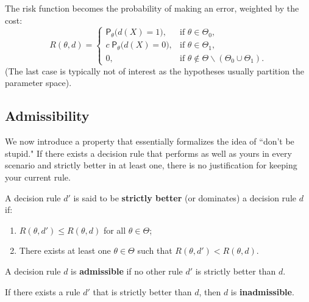 \begin{ex}[continued]
\begin{enumerate}[label=\roman*.]
    The risk function becomes the probability of making an error, weighted by the cost:
    \[
    R(\theta, d) = 
    \begin{cases} 
    \mathsf{P}_{\theta} \big( d(X) = 1 \big), & \text{if } \theta \in \Theta_0, \\ 
    c \; \mathsf{P}_{\theta} \big( d(X) = 0 \big), & \text{if } \theta \in \Theta_1, \\ 
    0, & \text{if } \theta \notin \Theta \backslash (\Theta_0 \cup \Theta_1). 
    \end{cases}
    \]
    (The last case is typically not of interest as the hypotheses usually partition the parameter space).
\end{enumerate}
\end{ex}

\subsection{Admissibility}
\label{subsec:admissibility}

We now introduce a property that essentially formalizes the idea of ``don't be stupid." If there exists a decision rule that performs as well as yours in every scenario and strictly better in at least one, there is no justification for keeping your current rule.

\begin{definition}
\label{def:strictly_better}
A decision rule \(d'\) is said to be \textbf{strictly better} (or dominates) a decision rule \(d\) if:
\begin{enumerate}
    \item \(R(\theta, d') \le R(\theta, d)\) for all \(\theta \in \Theta\);
    \item There exists at least one \(\theta \in \Theta\) such that \(R(\theta, d') < R(\theta, d)\).
\end{enumerate}

A decision rule \(d\) is \textbf{admissible} if no other rule \(d'\) is strictly better than \(d\).

If there exists a rule \(d'\) that is strictly better than \(d\), then \(d\) is \textbf{inadmissible}.
\end{definition}


